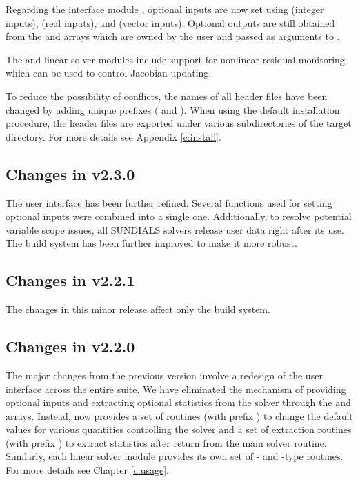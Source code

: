 Regarding the {\F} interface module {\fkinsol}, optional inputs are now
set using  (integer inputs),  (real inputs),
and  (vector inputs). Optional outputs are still obtained
from the  and  arrays which are owned by the user
and passed as arguments to .

The {\kindense} and {\kinband} linear solver modules include support for
nonlinear residual monitoring which can be used to control Jacobian
updating.

To reduce the possibility of conflicts, the names of all header files have
been changed by adding unique prefixes ( and ).
When using the default installation procedure, the header files are exported
under various subdirectories of the target  directory. For more
details see Appendix \ref{c:install}.

\subsection*{Changes in v2.3.0}

The user interface has been further refined. Several functions used
for setting optional inputs were combined into a single one.
Additionally, to resolve potential variable scope issues, all
SUNDIALS solvers release user data right after its use. The build
system has been further improved to make it more robust.

\subsection*{Changes in v2.2.1}

The changes in this minor {\sundials} release affect only the build system.

\subsection*{Changes in v2.2.0}

The major changes from the previous version involve a redesign of
the user interface across the entire {\sundials} suite. We have
eliminated the mechanism of providing optional inputs and
extracting optional statistics from the solver through the
 and  arrays. Instead, {\kinsol} now provides a
set of routines (with prefix ) to change the default
values for various quantities controlling the solver and a set of
extraction routines (with prefix ) to extract
statistics after return from the main solver routine. Similarly,
each linear solver module provides its own set of {-} and
{-type} routines. For more details see Chapter \ref{c:usage}.

